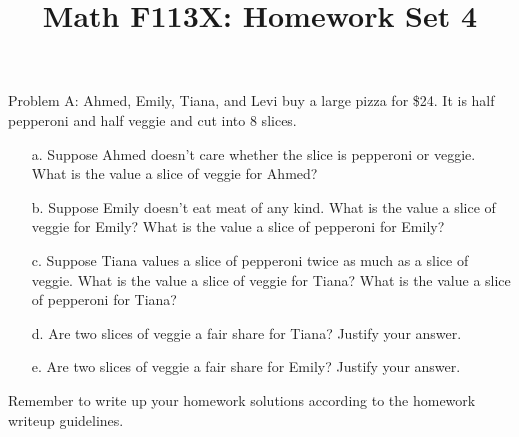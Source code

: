 \documentclass[11pt, oneside]{article}   	%
\title{Math F113X: Homework Set 4}
\date{}							%
\begin{document}
\maketitle




Problem A: Ahmed, Emily, Tiana, and Levi buy a large pizza for \$24. It is half pepperoni and half veggie and cut into 8 slices.
\begin{enumerate}
	\item[a.] Suppose Ahmed doesn't care whether the slice is pepperoni or veggie. What is the value a slice of veggie for Ahmed?
	\item[b.] Suppose Emily doesn't eat meat of any kind. What is the value a slice of veggie for Emily? What is the value a slice of pepperoni for Emily?
	\item[c.] Suppose Tiana values a slice of pepperoni twice as much as a slice of veggie. What is the value a slice of veggie for Tiana? What is the value a slice of pepperoni for Tiana?
	\item[d.] Are two slices of veggie a fair share for Tiana? Justify your answer.
	\item[e.] Are two slices of veggie a fair share for Emily? Justify your answer.
\end{enumerate}

\hrulefill

Remember to write up your homework solutions according to the homework writeup guidelines. 
\end{document}
